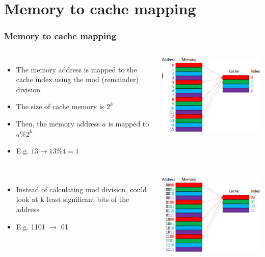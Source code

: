\documentclass{beamer}
\begin{document}
\section{Memory to cache mapping}
\begin{frame}[allowframebreaks]
\frametitle{Memory to cache mapping}
\begin{columns}[c]
\begin{itemize}
\item The memory address is mapped to the cache index using the mod (remainder) division
\item The size of cache memory is $2^k$
\item Then, the memory address $a$ is mapped to $a\%2^k$
\item E.g. {\color{green} $13\rightarrow13\%4 = 1$}
\end{itemize}
\includegraphics[scale=0.4]{mem.png}
\end{columns}
\framebreak
\begin{columns}[c]
\begin{itemize}
\item Instead of calculating mod division, could look at k least significant bits of the address
\item E.g. 11{\color{green}01} $\rightarrow$ {\color{green}01}
\end{itemize}
\includegraphics[scale=0.4]{mem2.png}
\end{columns}
\end{frame}
\end{document}
